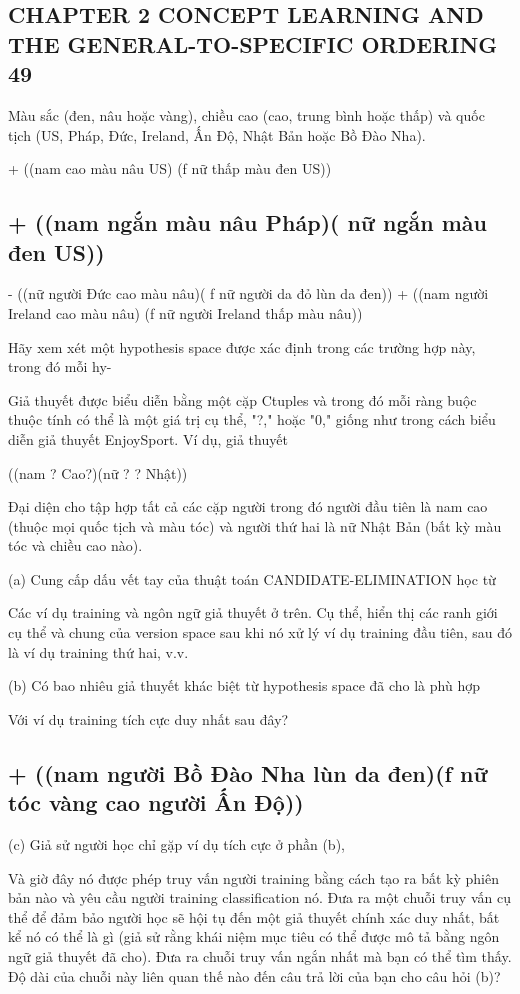 \subsection{CHAPTER 2 CONCEPT LEARNING AND THE GENERAL-TO-SPECIFIC ORDERING 49}

Màu sắc (đen, nâu hoặc vàng), chiều cao (cao, trung bình hoặc thấp) và quốc tịch (US, Pháp, Đức, Ireland, Ấn Độ, Nhật Bản hoặc Bồ Đào Nha).

+ ((nam cao màu nâu US) (f nữ thấp màu đen US))

\subsection{+ ((nam ngắn màu nâu Pháp)( nữ ngắn màu đen US))}

- ((nữ người Đức cao màu nâu)( f nữ người da đỏ lùn da đen)) + ((nam người Ireland cao màu nâu) (f nữ người Ireland thấp màu nâu))

Hãy xem xét một hypothesis space được xác định trong các trường hợp này, trong đó mỗi hy-

Giả thuyết được biểu diễn bằng một cặp Ctuples và trong đó mỗi ràng buộc thuộc tính có thể là một giá trị cụ thể, "?," hoặc "0," giống như trong cách biểu diễn giả thuyết EnjoySport. Ví dụ, giả thuyết

((nam ? Cao?)(nữ ? ? Nhật))

Đại diện cho tập hợp tất cả các cặp người trong đó người đầu tiên là nam cao (thuộc mọi quốc tịch và màu tóc) và người thứ hai là nữ Nhật Bản (bất kỳ màu tóc và chiều cao nào).

(a) Cung cấp dấu vết tay của thuật toán CANDIDATE-ELIMINATION học từ

Các ví dụ training và ngôn ngữ giả thuyết ở trên. Cụ thể, hiển thị các ranh giới cụ thể và chung của version space sau khi nó xử lý ví dụ training đầu tiên, sau đó là ví dụ training thứ hai, v.v.

(b) Có bao nhiêu giả thuyết khác biệt từ hypothesis space đã cho là phù hợp

Với ví dụ training tích cực duy nhất sau đây?

\subsection{+ ((nam người Bồ Đào Nha lùn da đen)(f nữ tóc vàng cao người Ấn Độ))}

(c) Giả sử người học chỉ gặp ví dụ tích cực ở phần (b),

Và giờ đây nó được phép truy vấn người training bằng cách tạo ra bất kỳ phiên bản nào và yêu cầu người training classification nó. Đưa ra một chuỗi truy vấn cụ thể để đảm bảo người học sẽ hội tụ đến một giả thuyết chính xác duy nhất, bất kể nó có thể là gì (giả sử rằng khái niệm mục tiêu có thể được mô tả bằng ngôn ngữ giả thuyết đã cho). Đưa ra chuỗi truy vấn ngắn nhất mà bạn có thể tìm thấy. Độ dài của chuỗi này liên quan thế nào đến câu trả lời của bạn cho câu hỏi (b)?

